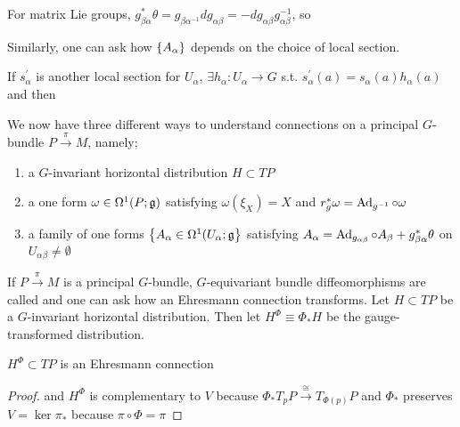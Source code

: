 \documentclass{article}
\begin{document}
\begin{example}
For matrix Lie groups, $g_{\beta\alpha}^\ast \theta = g_{\beta\alpha^{-1}}dg_{\alpha\beta} = -dg_{\alpha\beta}g_{\alpha\beta}^{-1}$, so 
\end{example}

Similarly, one can ask how $\left\{ A_\alpha \right\}$ depends on the choice of local section. 
\begin{fact}
If $s_\alpha^\prime$ is another local section for $U_\alpha$, $\exists h_\alpha : U_\alpha \to G$ s.t. $s_\alpha^\prime(a) = s_\alpha(a) h_\alpha(a)$ and then 
\end{fact}

\begin{idea}
We now have three different ways to understand connections on a principal $G$-bundle $P\overset{\pi}{\to} M$, namely;
\begin{enumerate}
    \item a $G$-invariant horizontal distribution $H\subset TP$ 
    \item a one form $\omega \in \Omega^1(P;\mathfrak{g})$ satisfying $\omega(\xi_X) = X$ and $r_g^\ast \omega = \operatorname{Ad}_{g^{-1}} \circ \omega$
    \item a family of one forms $\left\{ A_\alpha \in \Omega^1(U_\alpha;\mathfrak{g} \right\}$ satisfying $A_\alpha = \operatorname{Ad}_{g_{\alpha\beta}}\circ A_\beta + g_{\beta\alpha}^\ast \theta$ on $U_{\alpha\beta}\neq \emptyset$
\end{enumerate}
\end{idea}

If $P \overset{\pi}{\to} M$ is a principal $G$-bundle, $G$-equivariant bundle diffeomorphisms are called  and one can ask how an Ehresmann connection transforms. Let $H \subset TP$ be a $G$-invariant horizontal distribution. Then let $H^\Phi \equiv \Phi_\ast H$ be the gauge-transformed distribution. 

\begin{lemma}
$H^\Phi \subset TP$ is an Ehresmann connection
\end{lemma}
\begin{proof}
and $H^\Phi$ is complementary to $V$ because $\Phi_\ast T_pP \overset{\cong}{\to} T_{\Phi(p)}P$ and $\Phi_\ast$ preserves $V = \ker \pi_\ast$ because $\pi\circ\Phi=\pi$
\end{proof}
\end{document}
